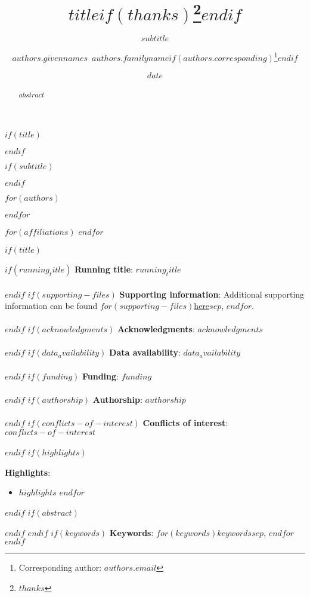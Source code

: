 \documentclass[11pt]{article}
\begin{document}
$if(title)$
\title{$title$$if(thanks)$\thanks{$thanks$}$endif$}
$endif$

$if(subtitle)$
\subtitle{$subtitle$}
$endif$

$for(authors)$
\author[$for(authors.affiliations)$$authors.affiliations$$sep$,$endfor$]{$authors.givennames$~$authors.familyname$$if(authors.corresponding)$\thanks{Corresponding author: $authors.email$}$endif$}
$endfor$

$for(affiliations)$
$endfor$

\date{$date$}

$if(title)$
\maketitle
$if(running_title)$
\small{{\bf Running title}: $running_title$}\\\\
$endif$
$if(supporting-files)$
\small{{\bf Supporting information}: Additional supporting information can be found $for(supporting-files)$\href{https://$github-user$.github.io/$github-user$/$supporting-files$.pdf}{here}$sep$, $endfor$.}\\\\
$endif$
$if(acknowledgments)$
\small{{\bf Acknowledgments}: $acknowledgments$}\\\\
$endif$
$if(data_availability)$
\small{{\bf Data availability}: $data_availability$}\\\\
$endif$
$if(funding)$
\small{{\bf Funding}: $funding$}\\\\
$endif$
$if(authorship)$
\small{{\bf Authorship}: $authorship$}\\\\
$endif$
$if(conflicts-of-interest)$
\small{{\bf Conflicts of interest}: $conflicts-of-interest$}\\\\
$endif$
$if(highlights)$
\small{{\bf Highlights}:\vspace{-1.5em}
\begin{itemize}
  $for(highlights)$
    \item $highlights$
  $endfor$
\end{itemize}}
$endif$
$if(abstract)$
\begin{abstract}
$abstract$
\end{abstract}
$endif$
$endif$
$if(keywords)$
\hspace{1cm}\small{{\bf Keywords}: $for(keywords)$$keywords$$sep$, $endfor$}
$endif$
\end{document}
